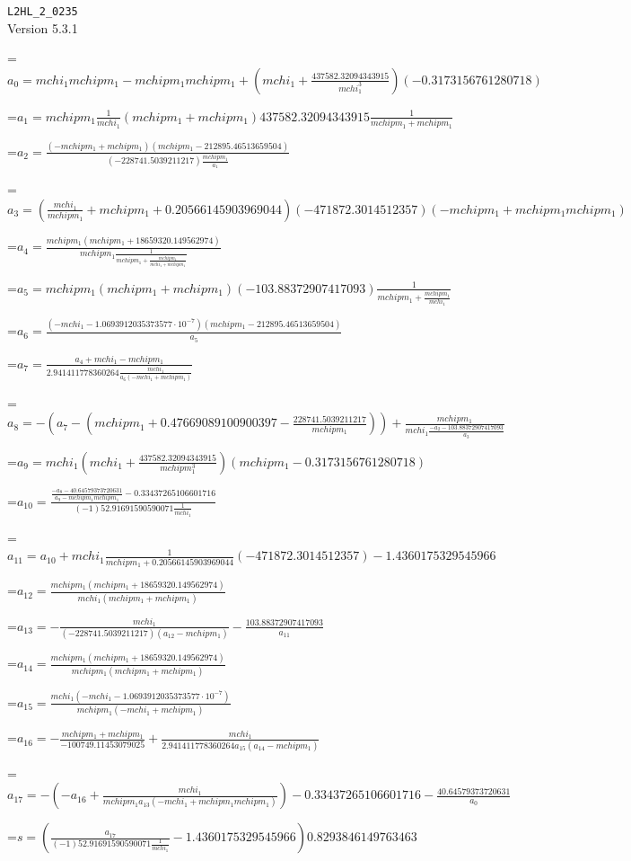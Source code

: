 \documentclass{article}
\newcommand{\exprline}[1]{\par\noindent\begingroup\setbox0=\hbox{$\displaystyle #1$}\ifdim\wd0>\linewidth\resizebox{\linewidth}{!}{\box0}\else\box0\fi\endgroup\par\medskip}
\begin{document}
\noindent\texttt{L2HL\_2\_0235}\\
Version 5.3.1\\
\exprline{a_{0} = mchi_{1} mchipm_{1} - mchipm_{1} mchipm_{1} + \left(mchi_{1} + \frac{437582.32094343915}{mchi_{1}^{3}}\right) \left(-0.3173156761280718\right)}
\exprline{a_{1} = mchipm_{1} \frac{1}{mchi_{1}} \left(mchipm_{1} + mchipm_{1}\right) 437582.32094343915 \frac{1}{mchipm_{1} + mchipm_{1}}}
\exprline{a_{2} = \frac{\left(- mchipm_{1} + mchipm_{1}\right) \left(mchipm_{1} - 212895.46513659504\right)}{\left(-228741.5039211217\right) \frac{mchipm_{1}}{a_{1}}}}
\exprline{a_{3} = \left(\frac{mchi_{1}}{mchipm_{1}} + mchipm_{1} + 0.20566145903969044\right) \left(-471872.3014512357\right) \left(- mchipm_{1} + mchipm_{1} mchipm_{1}\right)}
\exprline{a_{4} = \frac{mchipm_{1} \left(mchipm_{1} + 18659320.149562974\right)}{mchipm_{1} \frac{1}{mchipm_{1} + \frac{mchipm_{1}}{mchi_{1} + mchipm_{1}}}}}
\exprline{a_{5} = mchipm_{1} \left(mchipm_{1} + mchipm_{1}\right) \left(-103.88372907417093\right) \frac{1}{mchipm_{1} + \frac{mchipm_{1}}{mchi_{1}}}}
\exprline{a_{6} = \frac{\left(- mchi_{1} - 1.0693912035373577 \cdot 10^{-7}\right) \left(mchipm_{1} - 212895.46513659504\right)}{a_{5}}}
\exprline{a_{7} = \frac{a_{4} + mchi_{1} - mchipm_{1}}{2.941411778360264 \frac{mchi_{1}}{a_{6} \left(- mchi_{1} + mchipm_{1}\right)}}}
\exprline{a_{8} = - (a_{7} - \left(mchipm_{1} + 0.47669089100900397 - \frac{228741.5039211217}{mchipm_{1}}\right)) + \frac{mchipm_{1}}{mchi_{1} \frac{- a_{2} - 103.88372907417093}{a_{3}}}}
\exprline{a_{9} = mchi_{1} \left(mchi_{1} + \frac{437582.32094343915}{mchipm_{1}^{3}}\right) \left(mchipm_{1} - 0.3173156761280718\right)}
\exprline{a_{10} = \frac{\frac{- a_{8} - 40.64579373720631}{a_{9} - mchipm_{1} mchipm_{1}} - 0.33437265106601716}{\left(-1\right) 52.91691590590071 \frac{1}{mchi_{1}}}}
\exprline{a_{11} = a_{10} + mchi_{1} \frac{1}{mchipm_{1} + 0.20566145903969044} \left(-471872.3014512357\right) - 1.4360175329545966}
\exprline{a_{12} = \frac{mchipm_{1} \left(mchipm_{1} + 18659320.149562974\right)}{mchi_{1} \left(mchipm_{1} + mchipm_{1}\right)}}
\exprline{a_{13} = - \frac{mchi_{1}}{\left(-228741.5039211217\right) \left(a_{12} - mchipm_{1}\right)} - \frac{103.88372907417093}{a_{11}}}
\exprline{a_{14} = \frac{mchipm_{1} \left(mchipm_{1} + 18659320.149562974\right)}{mchipm_{1} \left(mchipm_{1} + mchipm_{1}\right)}}
\exprline{a_{15} = \frac{mchi_{1} \left(- mchi_{1} - 1.0693912035373577 \cdot 10^{-7}\right)}{mchipm_{1} \left(- mchi_{1} + mchipm_{1}\right)}}
\exprline{a_{16} = - \frac{mchipm_{1} + mchipm_{1}}{-100749.11453079025} + \frac{mchi_{1}}{2.941411778360264 a_{15} \left(a_{14} - mchipm_{1}\right)}}
\exprline{a_{17} = - (- a_{16} + \frac{mchi_{1}}{mchipm_{1} a_{13} \left(- mchi_{1} + mchipm_{1} mchipm_{1}\right)}) - 0.33437265106601716 - \frac{40.64579373720631}{a_{0}}}
\exprline{s = \left(\frac{a_{17}}{\left(-1\right) 52.91691590590071 \frac{1}{mchi_{1}}} - 1.4360175329545966\right) 0.8293846149763463}
\end{document}
